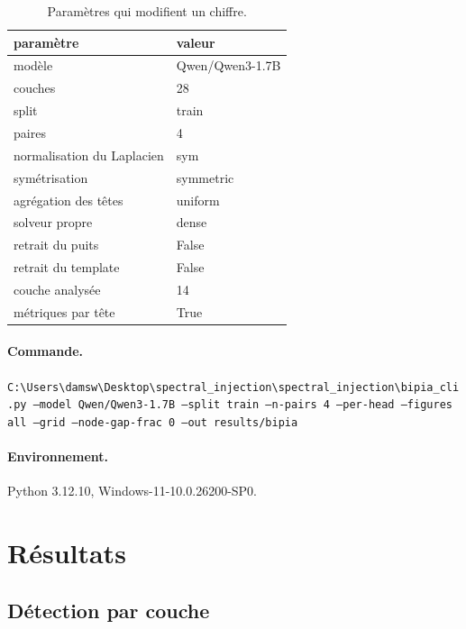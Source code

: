 \documentclass[11pt,a4paper]{article}
\begin{document}
\begin{table}[htbp]\centering\small
\begin{tabular}{ll}
\hline
paramètre & valeur \\
\hline
modèle & Qwen/Qwen3-1.7B \\
couches & 28 \\
split & train \\
paires & 4 \\
normalisation du Laplacien & sym \\
symétrisation & symmetric \\
agrégation des têtes & uniform \\
solveur propre & dense \\
retrait du puits & False \\
retrait du template & False \\
couche analysée & 14 \\
métriques par tête & True \\
\hline
\end{tabular}
\caption{Paramètres qui modifient un chiffre.}
\label{tab:config}
\end{table}


\paragraph{Commande.}
\texttt{C:\textbackslash{}Users\textbackslash{}damsw\textbackslash{}Desktop\textbackslash{}spectral\_injection\textbackslash{}spectral\_injection\textbackslash{}bipia\_cli.py --model Qwen/Qwen3-1.7B --split train --n-pairs 4 --per-head --figures all --grid --node-gap-frac 0 --out results/bipia}

\paragraph{Environnement.}
Python 3.12.10, Windows-11-10.0.26200-SP0.


\section{Résultats}

\subsection{Détection par couche}
\end{document}
